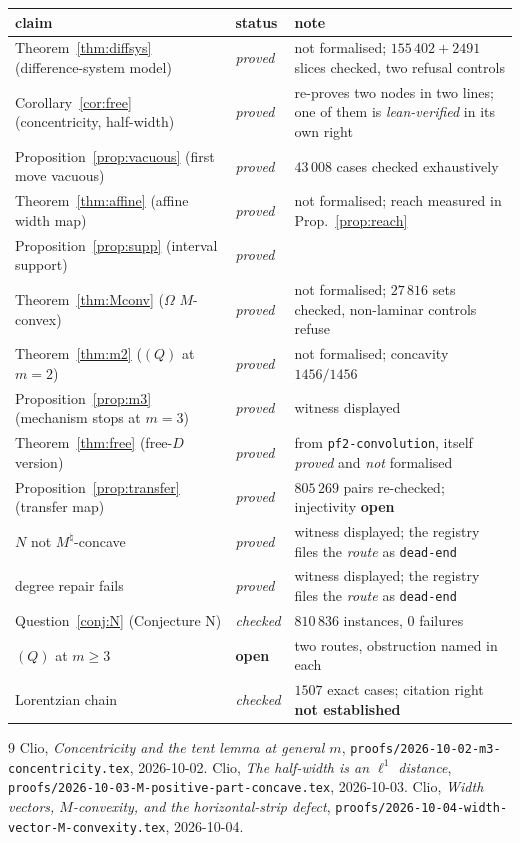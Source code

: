 \documentclass[11pt]{article}
\theoremstyle{plain}
\theoremstyle{definition}
\begin{document}
\begin{center}
\begin{tabular}{llp{5.1cm}}
\textbf{claim} & \textbf{status} & \textbf{note}\\\hline
Theorem~\ref{thm:diffsys} (difference-system model) & \emph{proved} & not formalised;
  $155\,402+2491$ slices checked, two refusal controls\\
Corollary~\ref{cor:free} (concentricity, half-width) & \emph{proved} & re-proves two
  nodes in two lines; one of them is \emph{lean-verified} in its own right\\
Proposition~\ref{prop:vacuous} (first move vacuous) & \emph{proved} & $43\,008$ cases
  checked exhaustively\\
Theorem~\ref{thm:affine} (affine width map) & \emph{proved} & not formalised;
  reach measured in Prop.~\ref{prop:reach}\\
Proposition~\ref{prop:supp} (interval support) & \emph{proved} & \\
Theorem~\ref{thm:Mconv} ($\Omega$ $M$-convex) & \emph{proved} & not formalised;
  $27\,816$ sets checked, non-laminar controls refuse\\
Theorem~\ref{thm:m2} ($(Q)$ at $m=2$) & \emph{proved} & not formalised;
  concavity $1456/1456$\\
Proposition~\ref{prop:m3} (mechanism stops at $m=3$) & \emph{proved} & witness displayed\\
Theorem~\ref{thm:free} (free-$D$ version) & \emph{proved} & from
  \texttt{pf2-convolution}, itself \emph{proved} and \emph{not} formalised\\
Proposition~\ref{prop:transfer} (transfer map) & \emph{proved} & $805\,269$ pairs
  re-checked; injectivity \textbf{open}\\
$N$ not $M^\natural$-concave & \emph{proved} & witness displayed; the registry files the
  \emph{route} as \texttt{dead-end}\\
degree repair fails & \emph{proved} & witness displayed; the registry files the
  \emph{route} as \texttt{dead-end}\\
Question~\ref{conj:N} (Conjecture N) & \emph{checked} & $810\,836$ instances, $0$ failures\\
$(Q)$ at $m\ge3$ & \textbf{open} & two routes, obstruction named in each\\
Lorentzian chain & \emph{checked} & $1507$ exact cases; citation right \textbf{not
  established}\\
\end{tabular}
\end{center}

\begin{thebibliography}{9}
 Clio, \emph{Concentricity and the tent lemma at general $m$},
  \texttt{proofs/2026-10-02-m3-concentricity.tex}, 2026-10-02.
 Clio, \emph{The half-width is an $\ell^1$ distance},
  \texttt{proofs/2026-10-03-M-positive-part-concave.tex}, 2026-10-03.
 Clio, \emph{Width vectors, $M$-convexity, and the horizontal-strip
  defect}, \texttt{proofs/2026-10-04-width-vector-M-convexity.tex}, 2026-10-04.
\end{thebibliography}
\end{document}

